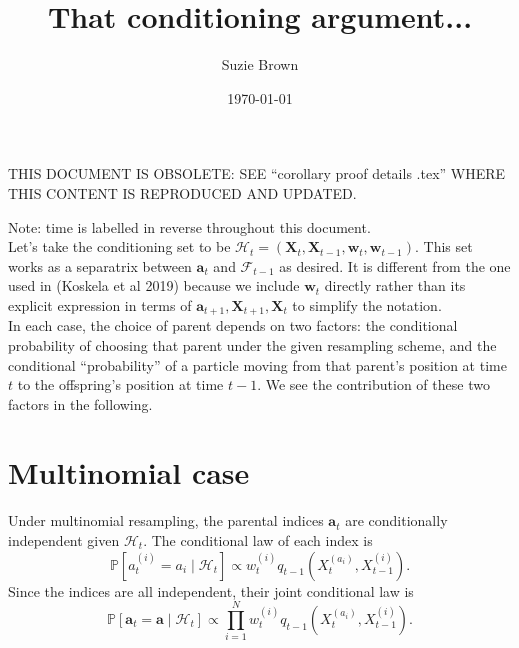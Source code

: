 \documentclass[fleqn]{article}
\title{That conditioning argument...}
\author{Suzie Brown}
\date{\today}
\newcommand{\PR}{\mathbb{P}}
\newcommand{\wt}[2][t]{w_{#1}^{(#2)}}
\begin{document}
\maketitle
\thispagestyle{fancy}

THIS DOCUMENT IS OBSOLETE: SEE ``corollary proof details .tex'' WHERE THIS CONTENT IS REPRODUCED AND UPDATED.

Note: time is labelled in reverse throughout this document.\\

Let's take the conditioning set to be $\mathcal{H}_t = (\mathbf{X}_t, \mathbf{X}_{t-1}, \mathbf{w}_t, \mathbf{w}_{t-1})$. This set works as a separatrix between $\mathbf{a}_{t}$ and $\mathcal{F}_{t-1}$ as desired. It is different from the one used in (Koskela et al 2019) because we include $\mathbf{w}_t$ directly rather than its explicit expression in terms of $\mathbf{a}_{t+1}, \mathbf{X}_{t+1}, \mathbf{X}_t$ to simplify the notation.\\

In each case, the choice of parent depends on two factors: the conditional probability of choosing that parent under the given resampling scheme, and the conditional ``probability'' of a particle moving from that parent's position at time $t$ to the offspring's position at time $t-1$. We see the contribution of these two factors in the following.

\section*{Multinomial case}
Under multinomial resampling, the parental indices $\mathbf{a}_t$ are conditionally independent given $\mathcal{H}_t$. The conditional law of each index is
\begin{equation*}
\PR [a_t^{(i)} = a_i \mid \mathcal{H}_t] \propto \wt{i} q_{t-1}(X_t^{(a_i)}, X_{t-1}^{(i)}).
\end{equation*}
Since the indices are all independent, their joint conditional law is
\begin{equation*}
\PR [\mathbf{a}_t = \mathbf{a} \mid \mathcal{H}_t] \propto \prod_{i=1}^N \wt{i} q_{t-1}(X_t^{(a_i)}, X_{t-1}^{(i)}).
\end{equation*}
\end{document}
